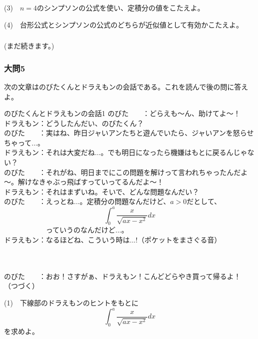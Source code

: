 \documentclass[a4j,dvipdfmx]{jsarticle}
\begin{document}
    (3)　$n=4$のシンプソンの公式を使い、定積分の値をこたえよ。

    (4)　台形公式とシンプソンの公式のどちらが近似値として有効かこたえよ。
    \subsubsection*{}
    (まだ続きます。)
    \newpage
    \subsubsection*{大問5}
    次の文章はのびたくんとドラえもンの会話である。これを読んで後の問に答えよ。
    \begin{itembox}[c]{のびたくんとドラえもンの会話1}
        のびた　　：どらえも～ん、助けてよ～！\\
        ドラえもン：どうしたんだい、のびたくん？\\
        のびた　　：実はね、昨日ジャいアンたちと遊んでいたら、ジャいアンを怒らせちゃって...。\\
        ドラえもン：それは大変だね...。でも明日になったら機嫌はもとに戻るんじゃない？\\
        のびた　　：それがね、明日までにこの問題を解けって言われちゃったんだよ～。解けなきゃぶっ飛ばすっていってるんだよ～！\\
        ドラえもン：それはまずいね。そいで、どんな問題なんだい？\\
        のびた　　：えっとね...。定積分の問題なんだけど、$a>0$だとして、
        \begin{equation*}
            \int_0^a\frac{x}{\sqrt{ax-x^2}}dx
        \end{equation*}
        　　　　　　っていうのなんだけど...。\\
        ドラえもン：なるほどね、こういう時は...!（ポケットをまさぐる音）\\\\
        \centerline{}\\

        のびた　　：おお！さすがぁ、ドラえもン！こんどどらやき買って帰るよ！
        （つづく）
    \end{itembox}
    (1)　下線部のドラえもンのヒントをもとに
    \begin{equation*}
        \int_0^a\frac{x}{\sqrt{ax-x^2}}dx
    \end{equation*}
    を求めよ。
\end{document}
